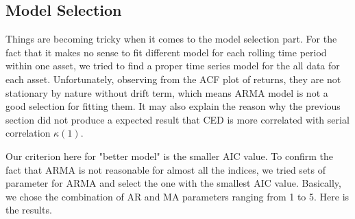 \documentclass[12pt]{article}
\begin{document}

\subsection{Model Selection}
Things are becoming tricky when it comes to the model selection part. For the fact that it makes no sense to fit different model for each rolling time period within one asset, we tried to find a proper time series model for the all data for each asset. Unfortunately, observing from the ACF plot of returns, they are not stationary by nature without drift term, which means ARMA model is not a good selection for fitting them. It may also explain the reason why the previous section did not produce a expected result that CED is more correlated with serial correlation $\kappa(1)$.

Our criterion here for "better model" is the smaller AIC value. To confirm the fact that ARMA is not reasonable for almost all the indices, we tried sets of parameter for ARMA and select the one with the smallest AIC value. Basically, we chose the combination of AR and MA parameters ranging from 1 to 5.  Here is the results.
\end{document}
